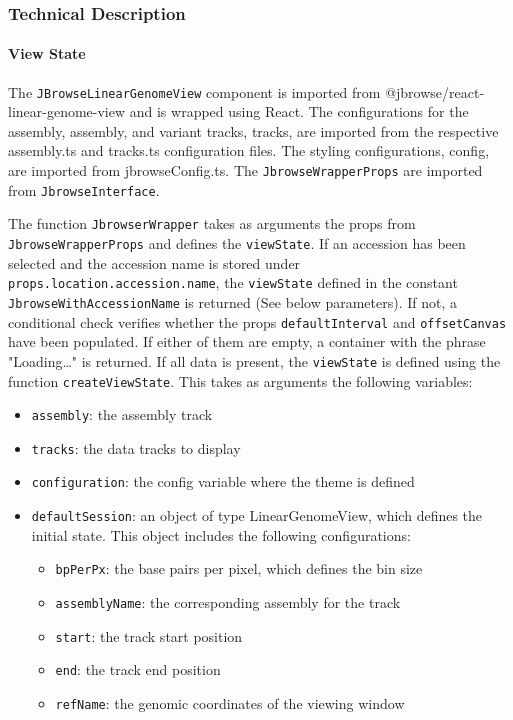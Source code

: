 \documentclass[12pt]{article}
\begin{document}
\subsubsection{Technical Description}

\paragraph{View State} 
The \verb +JBrowseLinearGenomeView+ component is imported from @jbrowse/react-linear-genome-view and is wrapped using React. The configurations for the assembly, assembly, and variant tracks, tracks, are imported from the respective assembly.ts and tracks.ts configuration files. The styling configurations, config, are imported from jbrowseConfig.ts. The \verb +JbrowseWrapperProps+ are imported from \verb +JbrowseInterface+. 

The function \verb +JbrowserWrapper+ takes as arguments the props from \verb +JbrowseWrapperProps+ and defines the \verb +viewState+. If an accession has been selected and the accession name is stored under \verb +props.location.accession.name+, the \verb +viewState+ defined in the constant \verb +JbrowseWithAccessionName+ is returned (See below parameters). If not, a conditional check verifies whether the props \verb +defaultInterval+ and \verb +offsetCanvas+ have been populated. If either of them are empty, a container with the phrase "Loading…" is returned. If all data is present, the \verb +viewState+ is defined using the function \verb +createViewState+. This takes as arguments the following variables: 
\begin{itemize}
\item \verb +assembly+: the assembly track 
\item \verb +tracks+: the data tracks to display 
\item \verb +configuration+: the config variable where the theme is defined 
\item \verb +defaultSession+: an object of type LinearGenomeView, which defines the initial state. This object includes the following configurations: 
\begin{itemize}
\item \verb +bpPerPx+: the base pairs per pixel, which defines the bin size 
\item \verb +assemblyName+: the corresponding assembly for the track 
\item \verb +start+: the track start position 
\item \verb +end+: the track end position 
\item \verb +refName+: the genomic coordinates of the viewing window 
\end{itemize}
\end{itemize}
\end{document}
